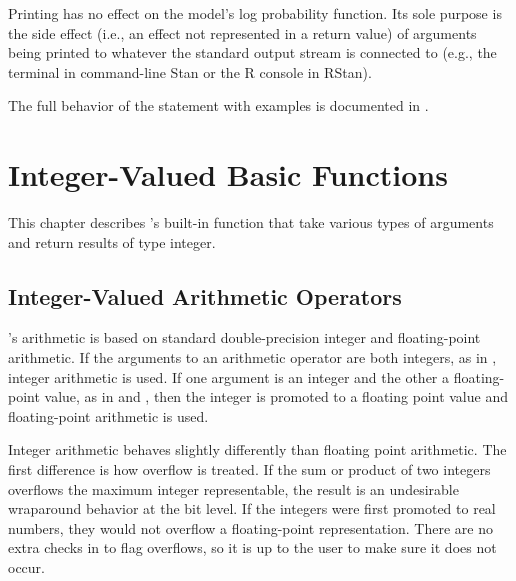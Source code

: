 Printing has no effect on the model's log probability function.  Its
sole purpose is the side effect (i.e., an effect not represented in a
return value) of arguments being printed to whatever the standard
output stream is connected to (e.g., the terminal in command-line Stan
or the R console in RStan).
%
\begin{description}
\end{description}
%
The full behavior of the  statement with examples is
documented in .


\chapter{Integer-Valued Basic Functions}

\noindent
This chapter describes \Stan's built-in function that take various
types of arguments and return results of type integer.


\section{Integer-Valued Arithmetic Operators}\label{int-arithmetic.section}

\Stan's arithmetic is based on standard double-precision \Cpp integer and
floating-point arithmetic.  If the arguments to an arithmetic operator
are both integers, as in , integer arithmetic is used.  If
one argument is an integer and the other a floating-point value, as in
 and , then the integer is promoted to a floating
point value and floating-point arithmetic is used.

Integer arithmetic behaves slightly differently than floating point
arithmetic.  The first difference is how overflow is treated.  If the
sum or product of two integers overflows the maximum integer
representable, the result is an undesirable wraparound behavior at the
bit level.  If the integers were first promoted to real numbers, they
would not overflow a floating-point representation.  There are no
extra checks in \Stan to flag overflows, so it is up to the user to
make sure it does not occur.

